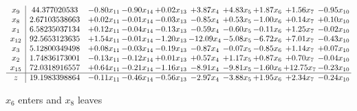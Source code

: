 \documentclass[9pt]{article}
\begin{document}
 \[\begin{array}{c| c c@{\hskip 2pt} c@{\hskip 2pt} c@{\hskip 2pt} c@{\hskip 2pt} c@{\hskip 2pt} c@{\hskip 2pt} c@{\hskip 2pt} c@{\hskip 2pt} }
 x_{9}   &  44.377020533 & -0.80 x_{11} & -0.90 x_{14} & +  0.02 x_{13} & +  3.87 x_{4} & +  4.83 x_{5} & +  1.87 x_{6} & +  1.56 x_{7} & -0.95 x_{10}\\
 x_{8}   &  2.67103538663 & +  0.02 x_{11} & -0.01 x_{14} & -0.03 x_{13} & -0.85 x_{4} & +  0.53 x_{5} & -1.00 x_{6} & +  0.14 x_{7} & +  0.10 x_{10}\\
 x_{1}   &  6.58235037134 & +  0.12 x_{11} & -0.04 x_{14} & -0.13 x_{13} & -0.59 x_{4} & -0.60 x_{5} & -0.11 x_{6} & +  1.25 x_{7} & -0.02 x_{10}\\
 x_{12}   &  92.5653123635 & +  1.54 x_{11} & -0.01 x_{14} & -1.20 x_{13} & -12.09 x_{4} & -5.08 x_{5} & -6.72 x_{6} & +  7.01 x_{7} & -0.43 x_{10}\\
 x_{3}   &  5.12800349498 & +  0.08 x_{11} & -0.03 x_{14} & -0.19 x_{13} & -0.87 x_{4} & -0.07 x_{5} & -0.85 x_{6} & +  1.14 x_{7} & +  0.07 x_{10}\\
 x_{2}   &  1.74836173001 & -0.13 x_{11} & -0.12 x_{14} & +  0.01 x_{13} & +  0.57 x_{4} & +  1.17 x_{5} & +  0.87 x_{6} & +  0.70 x_{7} & -0.04 x_{10}\\
 x_{15}   &  72.0318916557 & +  0.64 x_{11} & -0.21 x_{14} & -1.16 x_{13} & -8.91 x_{4} & -9.81 x_{5} & -1.60 x_{6} & + 12.75 x_{7} & -0.23 x_{10}\\
\hline
z    &  19.1983398864 & -0.11 x_{11} & -0.46 x_{14} & -0.56 x_{13} & -2.97 x_{4} & -3.88 x_{5} & +  1.95 x_{6} & +  2.34 x_{7} & -0.24 x_{10}\\
\end{array}\]


 $ x_{6} $ enters and $ x_{8} $ leaves 
\end{document}
